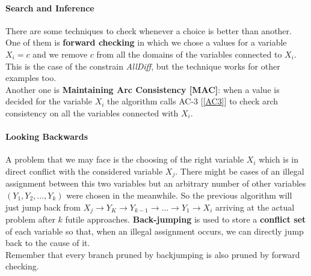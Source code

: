 \documentclass[10pt,a4paper]{article}
\begin{document}
\paragraph{Search and Inference}
There are some techniques to check whenever a choice is better than another. One of them is \textbf{forward checking} in which we chose a values for a variable $X_i=c$ and we remove $c$ from all the domains of the variables connected to $X_i$. This is the case of the constrain \textit{AllDiff}, but the technique works for other examples too.\\
Another one is \textbf{Maintaining Arc Consistency [MAC]}: when a value is decided for the variable $X_i$ the algorithm calls AC-3 [\ref{AC3}] to check arch consistency on all the variables connected with $X_i$.

\paragraph{Looking Backwards}
A problem that we may face is the choosing of the right variable $X_i$ which is in direct conflict with the considered variable $X_j$. There might be cases of an illegal assignment between this two variables but an arbitrary number of other variables $(Y_1,Y_2,...,Y_k)$ were chosen in the meanwhile. So the previous algorithm will just jump back from $X_j \rightarrow Y_K \rightarrow Y_{k-1} \rightarrow ...\rightarrow Y_1 \rightarrow X_i$ arriving at the actual problem after $k$ futile approaches. \textbf{Back-jumping} is used to store a \textbf{conflict set} of each variable so that, when an illegal assignment occurs, we can directly jump back to the cause of it.\\
Remember that every branch pruned by backjumping is also pruned by forward checking.
\end{document}
